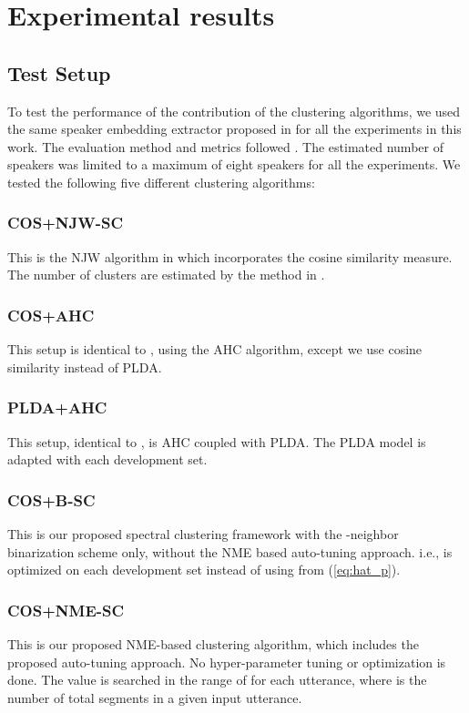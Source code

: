 \documentclass[journal]{IEEEtran}
\begin{document}
\vspace{-0.0ex}
\section{Experimental results}

\subsection{Test Setup}
To test the performance of the contribution of the clustering algorithms, we used the same speaker embedding extractor proposed in \cite{snyder2018x, snyder_git} for all the experiments in this work. The evaluation method and metrics followed \cite{fiscus2006rich}. The estimated number of speakers was limited to a maximum of eight speakers for all the experiments. We tested the following five different clustering algorithms: 
\subsubsection{COS+NJW-SC} This is the NJW algorithm in \cite{ng2002spectral} which incorporates the cosine similarity measure. The number of clusters are estimated by the method in \cite{ning2006spectral}.
\subsubsection{COS+AHC} This setup is identical to \cite{snyder2018x, snyder_git}, using the AHC algorithm, except we use cosine similarity instead of PLDA.
\subsubsection{PLDA+AHC} This setup, identical to \cite{snyder2018x, snyder_git}, is AHC coupled with PLDA.  The PLDA model is adapted with each development set.
\subsubsection{COS+B-SC} This is our proposed spectral clustering framework with the -neighbor binarization scheme only, without the NME based auto-tuning approach. i.e.,  is optimized on each development set instead of using  from (\ref{eq:hat_p}).
\subsubsection{COS+NME-SC} This is our proposed NME-based clustering algorithm, which includes the proposed auto-tuning approach. No hyper-parameter tuning or optimization is done. The  value is searched in the range of  for each utterance, where  is the number of total segments in a given input utterance.
\end{document}

